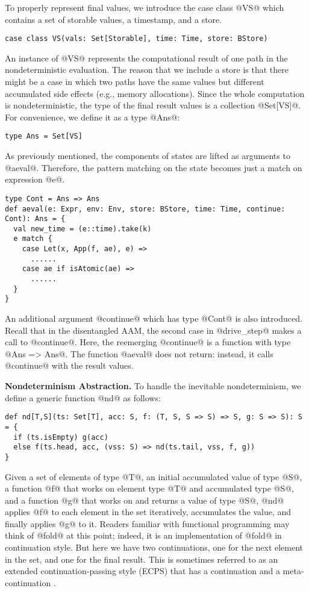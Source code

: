 \documentclass[acmsmall,review,anonymous]{acmart}\settopmatter{printfolios=true,printccs=false,printacmref=false}
\begin{document}
To properly represent final values, we introduce the case class @VS@ which
contains a set of storable values, a timestamp, and a store.
\begin{lstlisting}
case class VS(vals: Set[Storable], time: Time, store: BStore)
\end{lstlisting}
An instance of @VS@ represents the computational result of one path in
the nondeterministic evaluation.
The reason that we include a store is that there might be a case in which two paths have the same values but different accumulated side effects (e.g., memory allocations).
Since the whole computation is nondeterministic, the type of the final result
values is a collection @Set[VS]@. For convenience, we define it as a type @Ans@:
\begin{lstlisting}
type Ans = Set[VS]
\end{lstlisting}

As previously mentioned, the components of states are lifted as arguments to
@aeval@. Therefore, the pattern matching on the state becomes just a match on
expression @e@.
\begin{lstlisting}
type Cont = Ans => Ans
def aeval(e: Expr, env: Env, store: BStore, time: Time, continue: Cont): Ans = {
  val new_time = (e::time).take(k)
  e match {
    case Let(x, App(f, ae), e) =>
      ......
    case ae if isAtomic(ae) =>
      ......
  }
}
\end{lstlisting}

An additional argument @continue@ which has type @Cont@ is also introduced.
Recall that in the disentangled AAM, the second case in @drive_step@
makes a call to @continue@. Here, the reemerging @continue@ is a function
with type @Ans => Ans@. The function @aeval@ does not return: instead, it calls
@continue@ with the result values.

\textbf{Nondeterminism Abstraction.}
To handle the inevitable nondeterminism, we define a generic function @nd@ as follows:
\begin{lstlisting}
def nd[T,S](ts: Set[T], acc: S, f: (T, S, S => S) => S, g: S => S): S = {
  if (ts.isEmpty) g(acc)
  else f(ts.head, acc, (vss: S) => nd(ts.tail, vss, f, g))
}
\end{lstlisting}

Given a set of elements of type @T@, an initial accumulated value of type @S@, a function @f@
that works on element type @T@ and accumulated type @S@, and a function @g@ that
works on and returns a value of type @S@, @nd@ applies @f@ to each element in the
set iteratively, accumulates the value, and finally applies @g@ to it.
Readers familiar with functional programming may think of @fold@ at this point; indeed, it is an implementation of @fold@ in continuation style. But here we have two continuations, one for the next element in the set, and one for the final result.
This is sometimes referred to as an extended continuation-passing style (ECPS) that has a continuation and a meta-continuation \cite{Danvy:1990:AC:91556.91622}.
\end{document}
